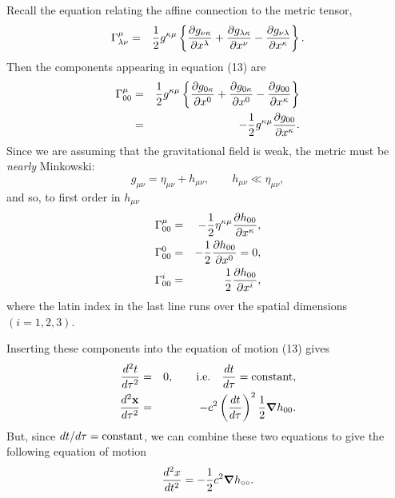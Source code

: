 Recall the equation relating the affine connection to the metric tensor,
\begin{eqnarray*}
\Gamma^\mu_{\lambda\nu} & = &
{1\over 2} g^{\kappa\mu} \left \{
{\partial g_{\nu\kappa}\over \partial x^\lambda} + 
{\partial g_{\lambda\kappa} \over \partial x^\nu} -
{\partial g_{\nu\lambda} \over \partial x^\kappa}
\right \} .
\end{eqnarray*}
Then the components appearing in equation (13) are
\begin{eqnarray*}
\Gamma^\mu_{00} & = & 
{1\over 2}g^{\kappa\mu} \left \{
{\partial g_{0\kappa} \over \partial x^0} +
{\partial g_{0\kappa} \over \partial x^0} -
{\partial g_{00} \over \partial x^\kappa}
\right \}\\
& = & 
- {1\over 2}g^{\kappa\mu} 
{\partial g_{00}\over \partial x^\kappa}.
\end{eqnarray*}
Since we are assuming that the gravitational field is weak, the metric must be
{\it nearly} Minkowski:
$$g_{\mu\nu} = \eta_{\mu\nu} + h_{\mu\nu}, \qquad  h_{\mu\nu} \ll
\eta_{\mu\nu}, $$
and so, to first order in $h_{\mu\nu}$
\begin{eqnarray*}
 \Gamma^\mu_{00 } & = & 
-{1\over 2} \eta^{\kappa\mu} 
{\partial h_{00} \over \partial x^\kappa},\\
 \Gamma^0_{00} & = & 
-{1\over 2} {\partial h_{00} \over \partial x^0} =0, \\
 \Gamma^i_{00} & = &
{1\over 2}{\partial h_{00} \over \partial x^i},
\end{eqnarray*}
where the latin index in the last line runs over the spatial
dimensions $(i= 1, 2, 3)$.

Inserting these components into the equation of motion (13) gives
\begin{eqnarray*}
{d^2t \over d\tau^2} & = & 0, \qquad
{\rm i.e.} \quad {dt\over d\tau} = {\rm constant}, \\
{d^2{\bf x}\over d\tau^2} & = &
-c^2 \left ({dt\over d\tau }\right )^2
{1\over 2}\mbox{\boldmath$\nabla$} h_{00}.
\end{eqnarray*}
But, since $dt/d\tau = {\rm constant}$, we can combine these two
equations to give the following equation of motion 
$$ {d^2x \over dt^2} = - {1\over 2}c^2 \mbox{\boldmath$\nabla$} h_{\circ\circ}.$$  



